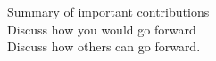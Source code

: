 Summary of important contributions \\
Discuss how you would go forward \\
Discuss how others can go forward.
